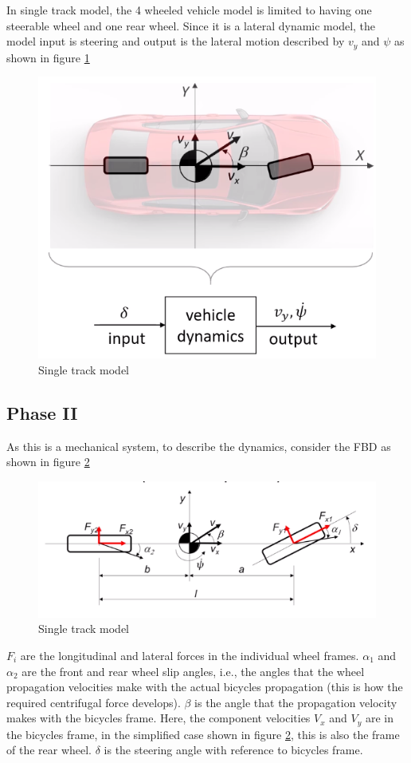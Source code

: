 In single track model, the 4 wheeled vehicle model is limited to having one steerable wheel and one rear wheel. Since it is a lateral dynamic model, the model input is steering and output is the lateral motion described by $v_y$ and $\psi$ as shown in figure \ref{Fig_ModelAutoSys_SingleTrackModel}
\begin{figure}[h!]
	\centering
	\includegraphics[width=0.65\linewidth]{Bilder/ModelAutoSys_SingleTrackMdoel}
	\caption{Single track model}
	\label{Fig_ModelAutoSys_SingleTrackModel}
\end{figure}
\newpage

\subsection{Phase II} \label{Sec_Phase2BicycleModel}

As this is a mechanical system, to describe the dynamics, consider the FBD as shown in figure \ref{Fig_ModelAutoSys_SingleTrackModel_FBD}
\begin{figure}[h!]
	\centering
	\includegraphics[width=\linewidth]{Bilder/ModelAutoSys_SingleTrackMdoel_FBD}
	\caption{Single track model}
	\label{Fig_ModelAutoSys_SingleTrackModel_FBD}
\end{figure}

$F_{i}$ are the longitudinal and lateral forces in the individual wheel frames. $\alpha_{1}$ and $\alpha_{2}$ are the front and rear wheel slip angles, i.e., the angles that the wheel propagation velocities make with the actual bicycles propagation (this is how the required centrifugal force develops). $\beta$ is the angle that the propagation velocity makes with the bicycles frame. Here, the component velocities $V_{x}$ and $V_{y}$ are in the bicycles frame, in the simplified case shown in figure \ref{Fig_ModelAutoSys_SingleTrackModel_FBD}, this is also the frame of the rear wheel. $\delta$ is the steering angle with reference to bicycles frame.

